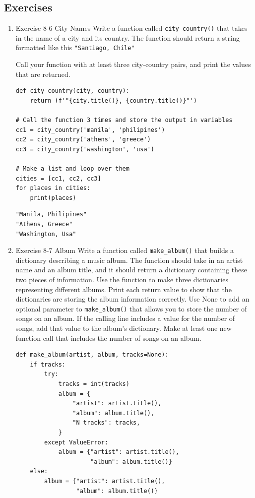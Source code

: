 \documentclass[10pt]{book}
\begin{document}
\subsection{Exercises}
\label{sec:org545d2c2}
\begin{enumerate}
\item Exercise 8-6 City Names
\label{sec:orgf688f0c}
Write a function called \texttt{city\_country()} that takes in the name of a city and its country. The function should return a string formatted like this
\texttt{"Santiago, Chile"}

Call your function with at least three city-country pairs, and print the values that are returned.
\begin{verbatim}
def city_country(city, country):
    return (f'"{city.title()}, {country.title()}"')

# Call the function 3 times and store the output in variables
cc1 = city_country('manila', 'philipines')
cc2 = city_country('athens', 'greece')
cc3 = city_country('washington', 'usa')

# Make a list and loop over them
cities = [cc1, cc2, cc3]
for places in cities:
    print(places)
\end{verbatim}

\label{orgace190e}
\begin{verbatim}
"Manila, Philipines"
"Athens, Greece"
"Washington, Usa"
\end{verbatim}
\item Exercise 8-7 Album
\label{sec:org1053aea}
Write a function called \texttt{make\_album()} that builds a dictionary describing a music album. The function should take in an artist name and an album title, and it should return a dictionary containing these two pieces of information. Use the function to make three dictionaries representing different albums. Print each return value to show that the dictionaries are storing the album information correctly. Use None to add an optional parameter to \texttt{make\_album()} that allows you to store the number of songs on an album. If the calling line includes a value for the number of songs, add that value to the album’s dictionary. Make at least one new function call that includes the number of songs on an album.
\begin{verbatim}
def make_album(artist, album, tracks=None):
    if tracks:
        try:
            tracks = int(tracks)
            album = {
                "artist": artist.title(),
                "album": album.title(),
                "N tracks": tracks,
            }
        except ValueError:
            album = {"artist": artist.title(),
                     "album": album.title()}
    else:
        album = {"artist": artist.title(),
                 "album": album.title()}  


\end{verbatim}
\end{enumerate}
\end{document}
